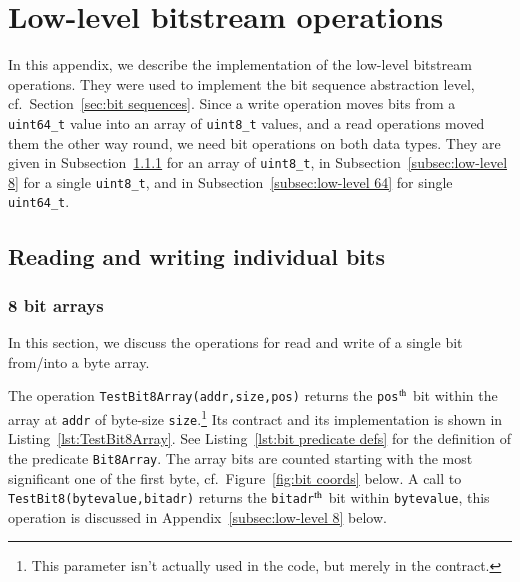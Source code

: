 
\chapter{Low-level bitstream operations}
\label{cha:low-level bitstream}

In this appendix, we describe the implementation of the
low-level bitstream operations.
%
They were used to implement the bit sequence abstraction level, cf.\
Section~\ref{sec:bit sequences}.
%
Since a write operation moves bits from a \lstinline{uint64_t} value
into an array of \lstinline{uint8_t} values, and a read operations
moved them the other way round,
we need bit operations on both data types.
%
They are given in
Subsection~\ref{subsec:low-level 8 array} 
for an array of \lstinline{uint8_t}, 
in Subsection~\ref{subsec:low-level 8} for a single \lstinline{uint8_t},
and
in Subsection~\ref{subsec:low-level 64} for single \lstinline{uint64_t}.













\section{Reading and writing individual bits}


\subsection{8 bit arrays}
\label{subsec:low-level 8 array}


In this section, we discuss the operations for read and write of a
single bit from/into a byte array.

The operation \lstinline{TestBit8Array(addr,size,pos)} returns the
\lstinline{pos}$^{\mbox{\scriptsize th}}$ bit
within the array at \lstinline{addr}
of byte-size \lstinline{size}.\footnote{
	This parameter isn't actually used in the code, but merely
	in the contract.
}
Its contract and its implementation is shown in
Listing~\ref{lst:TestBit8Array}.
%
See Listing~\ref{lst:bit predicate defs} for the definition of the predicate
\lstinline{Bit8Array}.
%
The array bits are counted starting with the most significant one of
the first byte,
cf.\ Figure~\ref{fig:bit coords} below.
%
A call to \lstinline{TestBit8(bytevalue,bitadr)} returns the 
\lstinline{bitadr}$^{\mbox{\scriptsize th}}$ bit
within \lstinline{bytevalue}, this operation is discussed in
Appendix~\ref{subsec:low-level 8} below.








